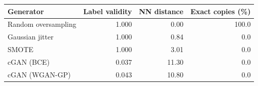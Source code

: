 \begin{tabular}{lrrr}
\toprule
\textbf{Generator} & \textbf{Label validity} & \textbf{NN distance} & \textbf{Exact copies (\%)}\\
\midrule
Random oversampling & 1.000 & 0.00 & 100.0\\
Gaussian jitter & 1.000 & 0.84 & 0.0\\
SMOTE & 1.000 & 3.01 & 0.0\\
cGAN (BCE) & 0.037 & 11.30 & 0.0\\
cGAN (WGAN-GP) & 0.043 & 10.80 & 0.0\\\bottomrule
\end{tabular}
